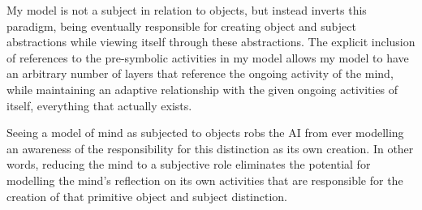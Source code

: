 My model is not a subject in relation to objects, but instead inverts
this paradigm, being eventually responsible for creating object and
subject abstractions while viewing itself through these abstractions.
The explicit inclusion of references to the pre-symbolic activities in
my model allows my model to have an arbitrary number of layers that
reference the ongoing activity of the mind, while maintaining an
adaptive relationship with the given ongoing activities of itself,
everything that actually exists.

Seeing a model of mind as subjected to objects robs the AI from ever
modelling an awareness of the responsibility for this distinction as
its own creation.  In other words, reducing the mind to a subjective
role eliminates the potential for modelling the mind's reflection on
its own activities that are responsible for the creation of that
primitive object and subject distinction.

